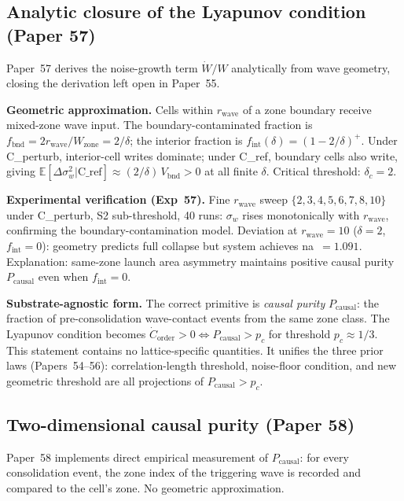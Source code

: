 \documentclass[11pt]{article}
\begin{document}
\subsection{Analytic closure of the Lyapunov condition (Paper 57)}

Paper~57 derives the noise-growth term $\dot{W}/W$ analytically from wave geometry,
closing the derivation left open in Paper~55.

\textbf{Geometric approximation.}
Cells within $r_\text{wave}$ of a zone boundary receive mixed-zone wave input.
The boundary-contaminated fraction is $f_\text{bnd} = 2r_\text{wave}/W_\text{zone} = 2/\delta$;
the interior fraction is $f_\text{int}(\delta) = (1-2/\delta)^+$.
Under C\_perturb, interior-cell writes dominate; under C\_ref, boundary cells also
write, giving $\mathbb{E}[\Delta\sigma_w^2 | \text{C\_ref}] \approx (2/\delta)\,V_\text{bnd} > 0$
at all finite $\delta$.
Critical threshold: $\delta_c = 2$.

\textbf{Experimental verification (Exp~57).}
Fine $r_\text{wave}$ sweep $\{2,3,4,5,6,7,8,10\}$ under C\_perturb, S2 sub-threshold,
40 runs: $\sigma_w$ rises monotonically with $r_\text{wave}$, confirming the
boundary-contamination model.
Deviation at $r_\text{wave}=10$ ($\delta=2$, $f_\text{int}=0$): geometry predicts
full collapse but system achieves na~$=1.091$.
Explanation: same-zone launch area asymmetry maintains positive causal purity
$P_\text{causal}$ even when $f_\text{int}=0$.

\textbf{Substrate-agnostic form.}
The correct primitive is \emph{causal purity} $P_\text{causal}$: the fraction of
pre-consolidation wave-contact events from the same zone class.
The Lyapunov condition becomes $\dot{C}_\text{order} > 0 \iff P_\text{causal} > p_c$
for threshold $p_c \approx 1/3$.
This statement contains no lattice-specific quantities.
It unifies the three prior laws (Papers~54--56): correlation-length threshold, noise-floor
condition, and new geometric threshold are all projections of $P_\text{causal} > p_c$.

\subsection{Two-dimensional causal purity (Paper 58)}

Paper~58 implements direct empirical measurement of $P_\text{causal}$: for every
consolidation event, the zone index of the triggering wave is recorded and compared
to the cell's zone. No geometric approximation.
\end{document}
